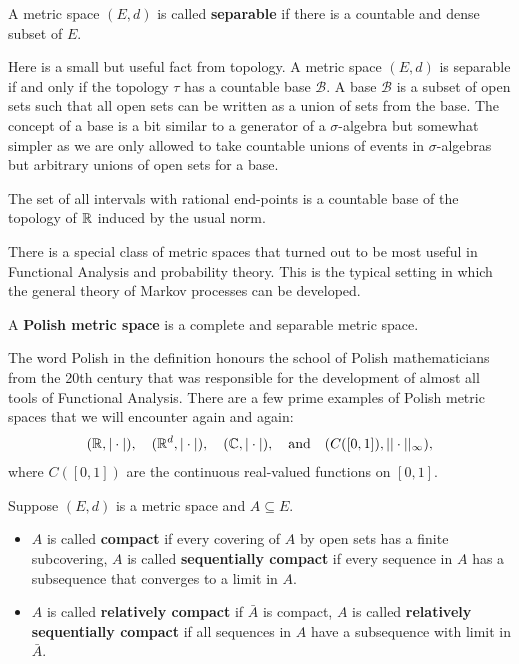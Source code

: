 \begin{ldef}
\begin{deff}
	A metric space $(E,d)$ is called \textbf{separable} if there is a countable and dense subset of $E$.
\end{deff}
\end{ldef}
Here is a small but useful fact from topology. A metric space $(E,d)$ is separable if and only if the topology $\tau$ has a countable base $\mathcal B$. A  base $\mathcal B$ is a subset of open sets such that all open sets can be written as a union of sets from the base. The concept of a base is a bit similar to a generator of a $\sigma$-algebra but somewhat simpler as we are only allowed to take countable unions of events in $\sigma$-algebras but arbitrary unions of open sets for a base.
\begin{luebung}
	The set of all intervals with rational end-points is a countable base of the topology of $\mathbb{R}$ induced by the usual norm.
\end{luebung}
There is a special class of metric spaces that turned out to be most useful in Functional Analysis and probability theory. This is the typical setting in which the general theory of Markov processes can be developed.
\begin{ldef}
\begin{deff}
	A \textbf{Polish metric space} is a  complete and separable metric space.
\end{deff}
\end{ldef}
The word Polish in the definition honours the school of Polish mathematicians from the 20th century that was responsible for the development of almost all tools of Functional Analysis. There are a few prime examples of Polish metric spaces that we will encounter again and again:
\begin{align*}
	(\mathbb{R},|\cdot|),\quad (\mathbb{R}^d, |\cdot|),\quad (\mathbb{C},|\cdot|),\quad\text{and}\quad (C([0,1]),||\cdot||_\infty),
\end{align*}
where $C([0,1])$ are the continuous real-valued functions on $[0,1]$. 
\begin{ldef}
\begin{deff}
	Suppose $(E,d)$ is a metric space and $A \subseteq E$. 
	\begin{itemize}
		\item
			$A$ is called \textbf{compact} if every covering of $A$ by open sets has a finite subcovering, $A$ is called \textbf{sequentially compact} if every sequence in $A$ has a subsequence that converges to a limit in $A$.
					\item
			$A$ is called \textbf{relatively compact} if $\bar{A}$ is compact, $A$ is called \textbf{relatively sequentially compact} if all sequences in $A$ have a subsequence with limit in $\bar{A}$.
	\end{itemize}
\end{deff}
\end{ldef}
